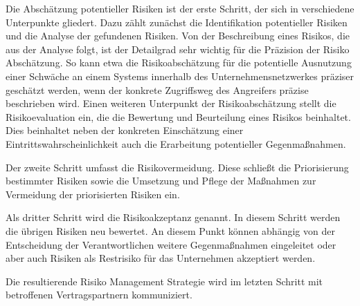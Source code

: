 Die Abschätzung potentieller Risiken ist der erste Schritt, der sich in verschiedene Unterpunkte gliedert. Dazu zählt zunächst die Identifikation potentieller Risiken und die Analyse der gefundenen Risiken. Von der Beschreibung eines Risikos, die aus der Analyse folgt, ist der Detailgrad sehr wichtig für die Präzision der Risiko Abschätzung. %
So kann etwa die Risikoabschätzung für die potentielle Ausnutzung einer Schwäche an einem Systems innerhalb des Unternehmensnetzwerkes präziser geschätzt werden, wenn der konkrete Zugriffsweg des Angreifers präzise beschrieben wird. Einen weiteren Unterpunkt der Risikoabschätzung stellt die Risikoevaluation ein, die die Bewertung und Beurteilung eines Risikos beinhaltet. Dies beinhaltet neben der konkreten Einschätzung einer Eintrittswahrscheinlichkeit auch die Erarbeitung potentieller Gegenmaßnahmen.

Der zweite Schritt umfasst die Risikovermeidung. Diese schließt die Priorisierung bestimmter Risiken sowie die Umsetzung und Pflege der Maßnahmen zur Vermeidung der priorisierten Risiken ein. 

Als dritter Schritt wird die Risikoakzeptanz genannt. In diesem Schritt werden die übrigen Risiken neu bewertet. An diesem Punkt können abhängig von der Entscheidung der Verantwortlichen weitere Gegenmaßnahmen eingeleitet oder aber auch Risiken als Restrisiko für das Unternehmen akzeptiert werden. 

Die resultierende Risiko Management Strategie wird im letzten Schritt mit betroffenen Vertragspartnern kommuniziert.